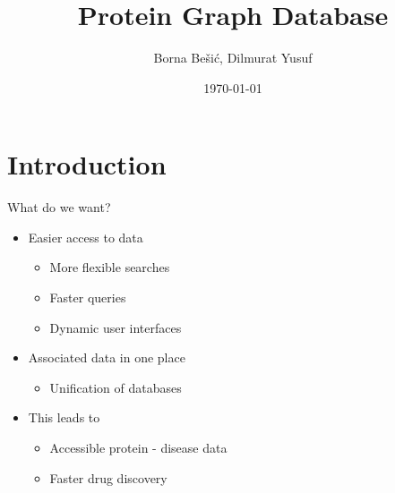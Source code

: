 \documentclass{beamer}
\title[Protein Graph DB]{ Protein Graph Database } %
\author{ Borna Bešić, Dilmurat Yusuf } %
\institute[] %
{
Bioinformatics Group \\
\medskip
Albert-Ludwigs-Universität, Freiburg  %
}
\date{\today} %
\begin{document}
\begin{frame}
\titlepage %
\end{frame}



\section{Introduction} %

\begin{frame}{What do we want?}
\begin{itemize}
    \item Easier access to data
    \begin{itemize}
        \item More flexible searches
        \item Faster queries
        \item Dynamic user interfaces
    \end{itemize}
    \vfill
    \item Associated data in one place
    \begin{itemize}
        \item Unification of databases
    \end{itemize}
    \vfill
    \item This leads to
    \begin{itemize}
        \item Accessible protein - disease data
        \item Faster drug discovery
    \end{itemize}
\end{itemize}
\end{frame}
\end{document}
